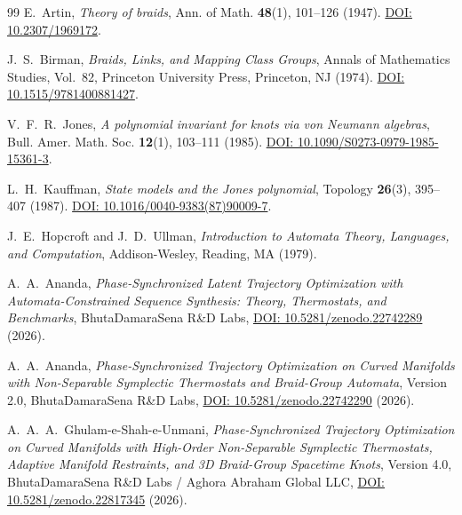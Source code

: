 \documentclass[11pt,a4paper,reqno]{article}
\theoremstyle{plain}
\theoremstyle{definition}
\theoremstyle{remark}
\numberwithin{equation}{section}
\begin{document}
\begin{thebibliography}{99}
E.~Artin, \textit{Theory of braids}, Ann. of Math. \textbf{48}(1), 101--126 (1947). \href{https://doi.org/10.2307/1969172}{DOI: 10.2307/1969172}.

J.~S.~Birman, \textit{Braids, Links, and Mapping Class Groups}, Annals of Mathematics Studies, Vol.~82, Princeton University Press, Princeton, NJ (1974). \href{https://doi.org/10.1515/9781400881427}{DOI: 10.1515/9781400881427}.

V.~F.~R.~Jones, \textit{A polynomial invariant for knots via von Neumann algebras}, Bull. Amer. Math. Soc. \textbf{12}(1), 103--111 (1985). \href{https://doi.org/10.1090/S0273-0979-1985-15361-3}{DOI: 10.1090/S0273-0979-1985-15361-3}.

L.~H.~Kauffman, \textit{State models and the Jones polynomial}, Topology \textbf{26}(3), 395--407 (1987). \href{https://doi.org/10.1016/0040-9383(87)90009-7}{DOI: 10.1016/0040-9383(87)90009-7}.

J.~E.~Hopcroft and J.~D.~Ullman, \textit{Introduction to Automata Theory, Languages, and Computation}, Addison-Wesley, Reading, MA (1979).

A.~A.~Ananda, \textit{Phase-Synchronized Latent Trajectory Optimization with Automata-Constrained Sequence Synthesis: Theory, Thermostats, and Benchmarks}, BhutaDamaraSena R\&D Labs, \href{https://doi.org/10.5281/zenodo.22742289}{DOI: 10.5281/zenodo.22742289} (2026).

A.~A.~Ananda, \textit{Phase-Synchronized Trajectory Optimization on Curved Manifolds with Non-Separable Symplectic Thermostats and Braid-Group Automata}, Version 2.0, BhutaDamaraSena R\&D Labs, \href{https://doi.org/10.5281/zenodo.22742290}{DOI: 10.5281/zenodo.22742290} (2026).

A.~A.~A.~Ghulam-e-Shah-e-Unmani, \textit{Phase-Synchronized Trajectory Optimization on Curved Manifolds with High-Order Non-Separable Symplectic Thermostats, Adaptive Manifold Restraints, and 3D Braid-Group Spacetime Knots}, Version 4.0, BhutaDamaraSena R\&D Labs / Aghora Abraham Global LLC, \href{https://doi.org/10.5281/zenodo.22817345}{DOI: 10.5281/zenodo.22817345} (2026).



\end{thebibliography}
\end{document}
